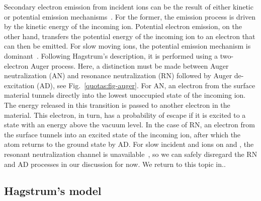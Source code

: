 \begin{refsection}
Secondary electron emission from incident ions can be the result of either kinetic or potential emission mechanisms~\cite{Burgdorfer2007}. For the former, the emission process is driven by the kinetic energy of the incoming ion. Potential electron emission, on the other hand, transfers the potential energy of the incoming ion to an electron that can then be emitted.  For slow moving ions, the potential emission mechanism is dominant~\cite{Aumayr2007}. Following Hagstrum's description, it is performed using a two-electron Auger process. Here, a distinction must be made between Auger neutralization (AN) and resonance neutralization (RN) followed by Auger de-excitation (AD), see Fig.~\ref{quotas:fig-auger}. For AN, an electron from the surface material tunnels directly into the lowest unoccupied state of the incoming ion. The energy released in this transition is passed to another electron in the material. This electron, in turn, has a probability of escape if it is excited to a state with an energy above the vacuum level. In the case of RN, an electron from the surface tunnels into an excited state of the incoming ion, after which the atom returns to the ground state by AD. For slow incident  and  ions on  and , the resonant neutralization channel is unavailable~\cite{Hagstrum1961, Lorente1994}, so we can safely disregard the RN and AD processes in our discussion for now. We return to this topic in.. \\

\subsection{Hagstrum's model} \label{quotas:sec-hagstrum}


\end{refsection}

